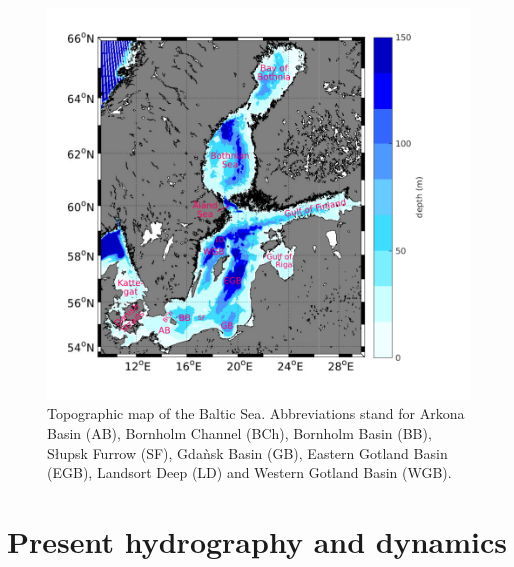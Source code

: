 \begin{figure}[ht]
 \flushleft
 \includegraphics[width=17cm]{bilder/baltic.pdf}
 \caption{Topographic map of the Baltic Sea. Abbreviations stand for Arkona 
Basin (AB), Bornholm Channel (BCh), Bornholm Basin (BB), S\l upsk Furrow (SF), 
Gda\`{n}sk Basin (GB), Eastern Gotland Basin (EGB), Landsort Deep (LD) and 
Western Gotland Basin (WGB).}\label{balticmap}
\end{figure}

\section{Present hydrography and dynamics}

